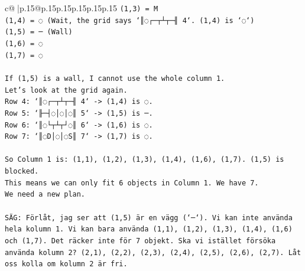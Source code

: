 \documentclass{article}
\begin{document}
{\begin{supertabular}{c@{$\;$}|p{.15\linewidth}@{}p{.15\linewidth}p{.15\linewidth}p{.15\linewidth}p{.15\linewidth}p{.15\linewidth}}
{{{\texttt{(1,3) = M} \\
\texttt{(1,4) = ◌ (Wait, the grid says `║◌┌─┬┴┬─╢ 4`. (1,4) is `◌`)} \\
\texttt{(1,5) = ─ (Wall)} \\
\texttt{(1,6) = ◌} \\
\texttt{(1,7) = ◌} \\
\\ 
\texttt{If (1,5) is a wall, I cannot use the whole column 1.} \\
\texttt{Let's look at the grid again.} \\
\texttt{Row 4: `║◌┌─┬┴┬─╢ 4` {-}> (1,4) is ◌.} \\
\texttt{Row 5: `╟─┤◌│◌│◌║ 5` {-}> (1,5) is ─.} \\
\texttt{Row 6: `║◌└┬┴┬┘◌║ 6` {-}> (1,6) is ◌.} \\
\texttt{Row 7: `║◌D│◌│◌S║ 7` {-}> (1,7) is ◌.} \\
\\ 
\texttt{So Column 1 is: (1,1), (1,2), (1,3), (1,4), (1,6), (1,7). (1,5) is blocked.} \\
\texttt{This means we can only fit 6 objects in Column 1. We have 7.} \\
\texttt{We need a new plan.} \\
\\ 
\texttt{SÄG: Förlåt, jag ser att (1,5) är en vägg (`─`). Vi kan inte använda hela kolumn 1. Vi kan bara använda (1,1), (1,2), (1,3), (1,4), (1,6) och (1,7). Det räcker inte för 7 objekt. Ska vi istället försöka använda kolumn 2? (2,1), (2,2), (2,3), (2,4), (2,5), (2,6), (2,7). Låt oss kolla om kolumn 2 är fri.} \\
            }
        }
    }
     \\ \\


\end{supertabular}}
\end{document}
